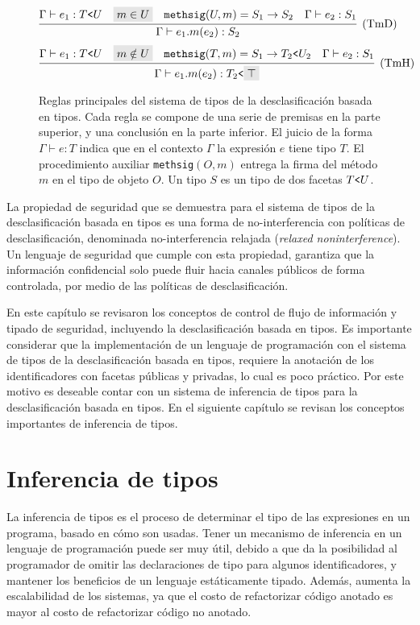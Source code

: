 \begin{figure}[ht]
  \centering
  \[
    \infer[(\text{TmD})]
    {\Gamma \vdash e_1.m(e_2) : S_2}
    {
    \Gamma \vdash e_1 : T\text{\texttt{<}}U&
    \highlight{m\in U}&
    \mathtt{methsig}(U,m) = S_1 \rightarrow S_2&
    \Gamma \vdash e_2 : S_1
    }
  \]
  \[
    \infer[(\text{TmH})]
    {\Gamma \vdash e_1.m(e_2) : T_2\text{\texttt{<}}\highlight{\top}}
    {
    \Gamma \vdash e_1 : T\text{\texttt{<}}U&
    \highlight{m\notin U}&
    \mathtt{methsig}(T,m) = S_1 \rightarrow T_2\text{\texttt{<}}U_2&
    \Gamma \vdash e_2 : S_1
    }
  \]
  \caption{Reglas principales del sistema de tipos de la desclasificación basada en tipos. Cada regla se compone de una serie de premisas en la parte superior, y una conclusión en la parte inferior. El juicio de la forma $\Gamma \vdash e : T$ indica que en el contexto $\Gamma$ la expresión $e$ tiene tipo $T$. El procedimiento auxiliar \texttt{methsig}$(O,m)$ entrega la firma del método $m$ en el tipo de objeto $O$. Un tipo $S$ es un tipo de dos facetas $T\text{\texttt{<}}U$.}
  \label{reglas}
\end{figure}

La propiedad de seguridad que se demuestra para el sistema de tipos de la desclasificación basada en tipos es una forma de no-interferencia con políticas de desclasificación, denominada no-interferencia relajada (\emph{relaxed noninterference}). Un lenguaje de seguridad que cumple con esta propiedad, garantiza que la información confidencial solo puede fluir hacia canales públicos de forma controlada, por medio de las políticas de desclasificación.

En este capítulo se revisaron los conceptos de control de flujo de información y tipado de seguridad, incluyendo la desclasificación basada en tipos. Es importante considerar que la implementación de un lenguaje de programación con el sistema de tipos de la desclasificación basada en tipos, requiere la anotación de los identificadores con facetas públicas y privadas, lo cual es poco práctico. Por este motivo es deseable contar con un sistema de inferencia de tipos para la desclasificación basada en tipos. En el siguiente capítulo se revisan los conceptos importantes de inferencia de tipos.

\chapter{Inferencia de tipos} \label{inference}
La inferencia de tipos es el proceso de determinar el tipo de las expresiones en un programa, basado en cómo son usadas. Tener un mecanismo de inferencia en un lenguaje de programación puede ser muy útil, debido a que da la posibilidad al programador de omitir las declaraciones de tipo para algunos identificadores, y mantener los beneficios de un lenguaje estáticamente tipado. Además, aumenta la escalabilidad de los sistemas, ya que el costo de refactorizar código anotado es mayor al costo de refactorizar código no anotado.

